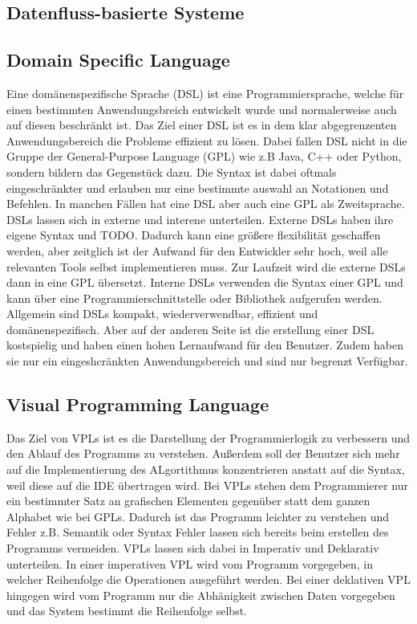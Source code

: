 \documentclass{article}
\begin{document}
    \subsection{Datenfluss-basierte Systeme}
    \subsection{Domain Specific Language}
    Eine domänenspezifische Sprache (DSL) ist eine Programmiersprache, welche für einen bestimmten Anwendungsbreich entwickelt wurde und normalerweise auch auf diesen beschränkt ist.
    Das Ziel einer DSL ist es in dem klar abgegrenzenten Anwendungsbereich die Probleme effizient zu lösen. \cite{18}
    Dabei fallen DSL nicht in die Gruppe der General-Purpose Language (GPL) wie z.B Java, C++ oder Python, sondern bildern das Gegenstück dazu. \cite{14}
    Die Syntax ist dabei oftmals eingeschränkter und erlauben nur eine bestimmte auswahl an Notationen und Befehlen. In manchen Fällen hat eine DSL aber auch eine GPL als Zweitsprache. \cite{18}
    DSLs lassen sich in externe und interene unterteilen. Externe DSLs haben ihre eigene Syntax und TODO. Dadurch kann eine größere flexibilität geschaffen werden, aber zeitglich ist der Aufwand für den Entwickler sehr hoch, weil alle relevanten Tools selbst implementieren muss. \cite{7}
    Zur Laufzeit wird die externe DSLs dann in eine GPL übersetzt. \cite{14}
    Interne DSLs verwenden die Syntax einer GPL und kann über eine Programmierschnittstelle oder Bibliothek aufgerufen werden. \cite{14}
    Allgemein sind DSLs kompakt, wiederverwendbar, effizient und domänenspezifisch. Aber auf der anderen Seite ist die erstellung einer DSL kostspielig und haben einen hohen Lernaufwand für den Benutzer. Zudem haben sie nur ein eingeshcränkten Anwendungsbereich und sind nur begrenzt Verfügbar. \cite{18} 
    \subsection{Visual Programming Language}
    Das Ziel von VPLs ist es die Darstellung der Programmierlogik zu verbessern und den Ablauf des Programms zu verstehen. \cite{13} Außerdem soll der Benutzer sich mehr auf die Implementierung des ALgortithmus konzentrieren anstatt auf die Syntax, weil diese auf die IDE übertragen wird. \cite{10}
    Bei VPLs stehen dem Programmierer nur ein bestimmter Satz an grafischen Elementen gegenüber statt dem ganzen Alphabet wie bei GPLs. Dadurch ist das Programm leichter zu verstehen und Fehler z.B. Semantik oder Syntax Fehler lassen sich bereits beim erstellen des Programms vermeiden. \cite{10}
    VPLs lassen sich dabei in Imperativ und Deklarativ unterteilen. In einer imperativen VPL wird vom Programm vorgegeben, in welcher Reihenfolge die Operationen ausgeführt werden. Bei einer deklativen VPL hingegen wird vom Programm nur die Abhänigkeit zwischen Daten vorgegeben und das System bestimmt die Reihenfolge selbst. \cite{21}
    \newpage
\end{document}
